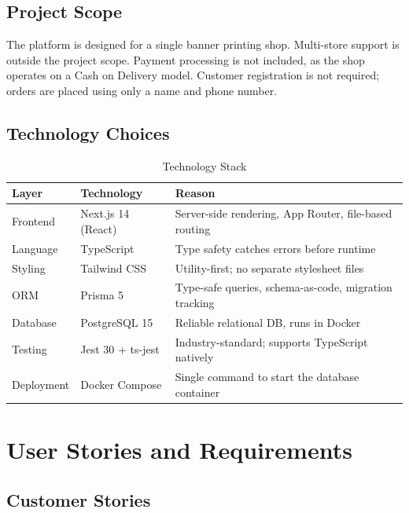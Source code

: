 \documentclass[12pt, a4paper]{article}
\begin{document}
\subsection{Project Scope}

The platform is designed for a single banner printing shop. Multi-store support is outside the project scope. Payment processing is not included, as the shop operates on a Cash on Delivery model. Customer registration is not required; orders are placed using only a name and phone number.

\subsection{Technology Choices}

\begin{table}[H]
\centering
\caption{Technology Stack}
\begin{tabularx}{\textwidth}{lXX}
\toprule
\textbf{Layer} & \textbf{Technology} & \textbf{Reason} \\
\midrule
Frontend   & Next.js 14 (React)    & Server-side rendering, App Router, file-based routing \\
Language   & TypeScript            & Type safety catches errors before runtime \\
Styling    & Tailwind CSS          & Utility-first; no separate stylesheet files \\
ORM        & Prisma 5              & Type-safe queries, schema-as-code, migration tracking \\
Database   & PostgreSQL 15         & Reliable relational DB, runs in Docker \\
Testing    & Jest 30 + ts-jest     & Industry-standard; supports TypeScript natively \\
Deployment & Docker Compose        & Single command to start the database container \\
\bottomrule
\end{tabularx}
\end{table}

\section{User Stories and Requirements}

\subsection{Customer Stories}
\end{document}

